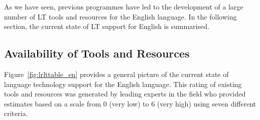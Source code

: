 \begin{multicols}{2}
As we have seen, previous programmes have led to the development of a large number of LT tools and resources for the English language. In the following section, the current state of LT support for English is summarised.

\subsection{Availability of Tools and Resources}

Figure~\ref{fig:lrlttable_en} provides a general picture of the current state of language technology support for the English language. This rating of existing tools and resources was generated by leading experts in the field who provided estimates based on a scale from 0 (very low) to 6 (very high) using seven different criteria.


\end{multicols}

